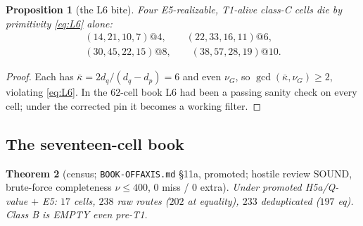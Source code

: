 \documentclass[11pt]{article}
\newtheorem{theorem}{Theorem}[section]
\newtheorem{proposition}[theorem]{Proposition}
\theoremstyle{definition}
\theoremstyle{remark}
\newcommand{\kb}{\bar\kappa}
\begin{document}
\begin{proposition}[the L6 bite]\label{prop:L6bite}
Four E5-realizable, T1-alive class-C cells die by primitivity \eqref{eq:L6} alone:
\begin{gather*}
(14,21,10,7)@4,\qquad(22,33,16,11)@6,\\
(30,45,22,15)@8,\qquad(38,57,28,19)@10 .
\end{gather*}
\end{proposition}

\begin{proof}
Each has $\kb=2d_q/(d_q-d_p)=6$ and even $\nu_G$, so $\gcd(\kb,\nu_G)\geq2$, violating \eqref{eq:L6}. In the $62$-cell book L6 had been a passing sanity check on every cell; under the corrected pin it becomes a working filter.
\end{proof}

\subsection{The seventeen-cell book}

\begin{theorem}[census; \texttt{BOOK-OFFAXIS.md} \S11a, promoted; hostile review SOUND, brute-force completeness $\nu\leq400$, $0$ miss / $0$ extra]\label{thm:census}
Under promoted H5a/Q-value $+$ E5: $17$ cells, $238$ raw routes ($202$ at equality), $233$ deduplicated ($197$ eq). Class B is EMPTY even pre-T1.
\end{theorem}
\end{document}
